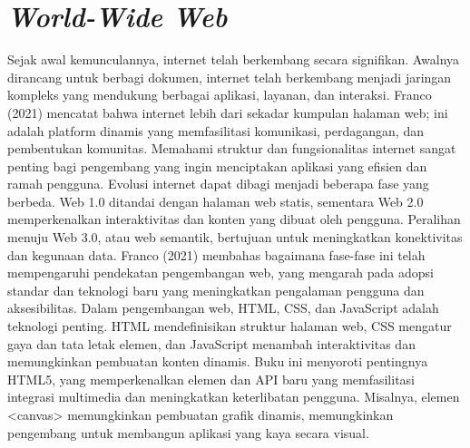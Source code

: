 \section{\textit{World-Wide Web}}
Sejak awal kemunculannya, internet telah berkembang secara signifikan. Awalnya dirancang untuk berbagi dokumen, internet telah berkembang menjadi jaringan kompleks yang mendukung berbagai aplikasi, layanan, dan interaksi. Franco (2021) mencatat bahwa internet lebih dari sekadar kumpulan halaman web; ini adalah platform dinamis yang memfasilitasi komunikasi, perdagangan, dan pembentukan komunitas. Memahami struktur dan fungsionalitas internet sangat penting bagi pengembang yang ingin menciptakan aplikasi yang efisien dan ramah pengguna.
\singlespacing{}
Evolusi internet dapat dibagi menjadi beberapa fase yang berbeda. Web 1.0 ditandai dengan halaman web statis, sementara Web 2.0 memperkenalkan interaktivitas dan konten yang dibuat oleh pengguna. Peralihan menuju Web 3.0, atau web semantik, bertujuan untuk meningkatkan konektivitas dan kegunaan data. Franco (2021) membahas bagaimana fase-fase ini telah mempengaruhi pendekatan pengembangan web, yang mengarah pada adopsi standar dan teknologi baru yang meningkatkan pengalaman pengguna dan aksesibilitas.
\singlespacing{}
Dalam pengembangan web, HTML, CSS, dan JavaScript adalah teknologi penting. HTML mendefinisikan struktur halaman web, CSS mengatur gaya dan tata letak elemen, dan JavaScript menambah interaktivitas dan memungkinkan pembuatan konten dinamis. Buku ini menyoroti pentingnya HTML5, yang memperkenalkan elemen dan API baru yang memfasilitasi integrasi multimedia dan meningkatkan keterlibatan pengguna. Misalnya, elemen <canvas> memungkinkan pembuatan grafik dinamis, memungkinkan pengembang untuk membangun aplikasi yang kaya secara visual.

